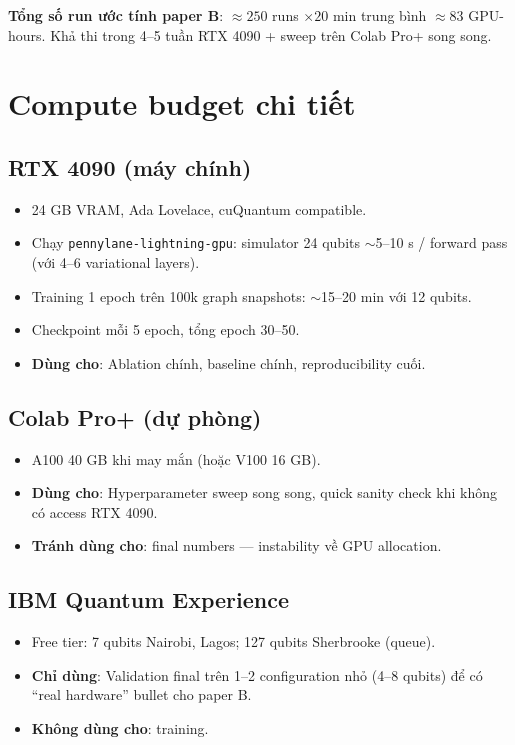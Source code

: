 \documentclass[11pt,a4paper]{article}
\begin{document}
\textbf{Tổng số run ước tính paper B}: $\approx 250$ runs $\times 20$ min trung bình $\approx 83$ GPU-hours. Khả thi trong 4--5 tuần RTX 4090 + sweep trên Colab Pro+ song song.

\section{Compute budget chi tiết}

\subsection{RTX 4090 (máy chính)}
\begin{itemize}
  \item 24 GB VRAM, Ada Lovelace, cuQuantum compatible.
  \item Chạy \texttt{pennylane-lightning-gpu}: simulator 24 qubits $\sim$5--10 s / forward pass (với 4--6 variational layers).
  \item Training 1 epoch trên 100k graph snapshots: $\sim$15--20 min với 12 qubits.
  \item Checkpoint mỗi 5 epoch, tổng epoch 30--50.
  \item \textbf{Dùng cho}: Ablation chính, baseline chính, reproducibility cuối.
\end{itemize}

\subsection{Colab Pro+ (dự phòng)}
\begin{itemize}
  \item A100 40 GB khi may mắn (hoặc V100 16 GB).
  \item \textbf{Dùng cho}: Hyperparameter sweep song song, quick sanity check khi không có access RTX 4090.
  \item \textbf{Tránh dùng cho}: final numbers --- instability về GPU allocation.
\end{itemize}

\subsection{IBM Quantum Experience}
\begin{itemize}
  \item Free tier: 7 qubits Nairobi, Lagos; 127 qubits Sherbrooke (queue).
  \item \textbf{Chỉ dùng}: Validation final trên 1--2 configuration nhỏ (4--8 qubits) để có ``real hardware'' bullet cho paper B.
  \item \textbf{Không dùng cho}: training.
\end{itemize}
\end{document}
